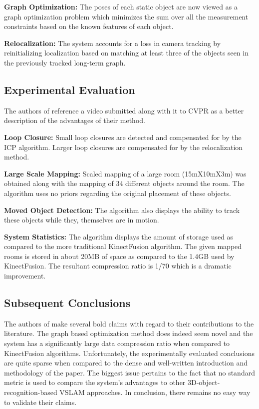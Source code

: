 \documentclass[10pt,twocolumn,letterpaper]{article}
\begin{document}
\textbf{Graph Optimization:} The poses of each static object are now viewed as a graph optimization problem which minimizes the sum over all the measurement constraints based on the known features of each object.

\textbf{Relocalization:} The system accounts for a loss in camera tracking by reinitializing localization based on matching at least three of the objects seen in the previously tracked long-term graph. 

\subsection{Experimental Evaluation}
The authors of \cite{Salas-Moreno_2013_CVPR} reference a video submitted along with it to CVPR as a better description of the advantages of their method. 

\textbf{Loop Closure:} Small loop closures are detected and compensated for by the ICP algorithm. Larger loop closures are compensated for by the relocalization method. 

\textbf{Large Scale Mapping:} Scaled mapping of a large room (15mX10mX3m) was obtained along with the mapping of 34 different objects around the room. The algorithm uses no priors regarding the original placement of these objects.

\textbf{Moved Object Detection:} The algorithm also displays the ability to track these objects while they, themselves are in motion. 

\textbf{System Statistics:} The algorithm displays the amount of storage used as compared to the more traditional KinectFusion algorithm. The given mapped rooms is stored in about 20MB of space as compared to the 1.4GB used by KinectFusion. The resultant compression ratio is 1/70 which is a dramatic improvement. 

\subsection{Subsequent Conclusions}
The authors of \cite{Salas-Moreno_2013_CVPR} make several bold claims with regard to their contributions to the literature. The graph based optimization method does indeed seem novel and the system has a significantly large data compression ratio when compared to KinectFusion algorithms. Unfortunately, the experimentally evaluated conclusions are quite sparse when compared to the dense and well-written introduction and methodology of the paper. The biggest issue pertains to the fact that no standard metric is used to compare the system's advantages to other 3D-object-recognition-based VSLAM approaches. In conclusion, there remains no easy way to validate their claims.
\end{document}
